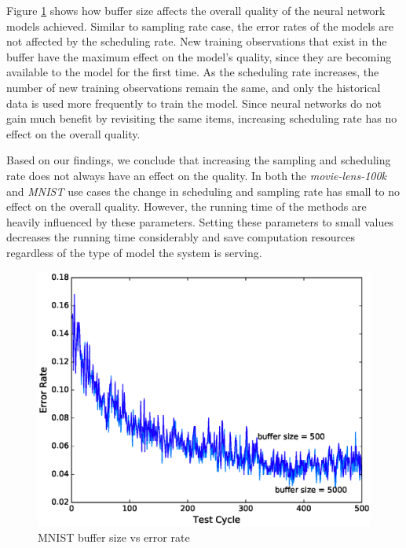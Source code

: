 \documentclass{vldb}
\begin{document}
Figure \ref{fig:mnist-buffer-size} shows how buffer size affects the overall quality of the neural network models achieved.
Similar to sampling rate case, the error rates of the models are not affected by the scheduling rate.
New training observations that exist in the buffer have the maximum effect on the model's quality, since they are becoming available to the model for the first time.
As the scheduling rate increases, the number of new training observations remain the same, and only the historical data is used more frequently to train the model.
Since neural networks do not gain much benefit by revisiting the same items, increasing scheduling rate has no effect on the overall quality.

Based on our findings, we conclude that increasing the sampling and scheduling rate does not always have an effect on the quality.
In both the \textit{movie-lens-100k} and \textit{MNIST} use cases the change in scheduling and sampling rate has small to no effect on the overall quality.
However, the running time of the methods are heavily influenced by these parameters.
Setting these parameters to small values decreases the running time considerably and save computation resources regardless of the type of model the system is serving.


\begin{figure}[!ht]
\centering
\includegraphics[width=\columnwidth]{../images/experiment-results/mnist-buffer-size}
\caption{MNIST buffer size vs error rate}
\label{fig:mnist-buffer-size}
\end{figure}
\end{document}
